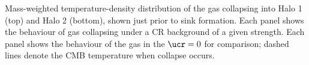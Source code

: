 \label{fig:temp}
Mass-weighted temperature-density distribution of the gas collapsing into Halo 1 (top) and Halo 2 (bottom), shown just prior to sink formation. Each panel shows the behaviour of gas collapsing under a CR background of a given strength. Each panel shows the behaviour of the gas in the $\ucr=0$ for comparison; dashed lines denote the CMB temperature when collapse occurs.
